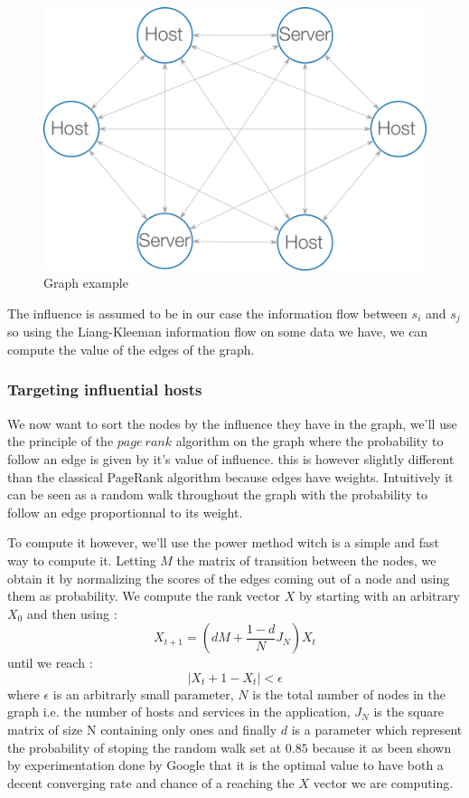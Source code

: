 \documentclass[10pt,a4paper,oneside]{article}
\begin{document}
\begin{figure}[!h]
\centering
\includegraphics[scale=0.6]{./images/PNG/Graphe.png}
\caption{Graph example}
\label{graph}
\end{figure}



\begin{multicols}{2}
The influence is assumed to be in our case the information flow between $s_i$ and $s_j$ so using the Liang-Kleeman information flow \cite{ref3} on some data we have, we can compute the value of the edges of the graph.
\subsubsection{Targeting influential hosts}
We now want to sort the nodes by the influence they have in the graph, we'll use the principle of the $page~rank$ algorithm \cite{ref4} on the graph where the probability to follow an edge is given by it's value of influence. this is however slightly different than the classical PageRank algorithm because edges have weights. Intuitively it can be seen as a random walk throughout the graph with the probability to follow an edge proportionnal to its weight.

To compute it however, we'll  use the power method witch is a simple and fast way to compute it. Letting $M$ the matrix of transition between the nodes, we obtain it by normalizing the scores of the edges coming out of a node and using them as probability. We compute the rank vector $X$ by starting with an arbitrary $X_0$ and then using :
	\[X_{t+1} = (dM + \frac{1-d}{N}J_N)X_t\]
until we reach :
	\[ \mid{X_t+1 - X_t}\mid < \epsilon\]
where $\epsilon$ is an arbitrarly small parameter, $N$ is the total number of nodes in the graph i.e. the number of hosts and services in the application, $J_N$ is the square matrix of size N containing only ones and finally $d$ is a parameter which represent the probability of stoping the random walk set at $0.85$ because it as been shown by experimentation done by Google that it is the optimal value to have both a decent converging rate and chance of a reaching the $X$ vector we are computing.
\end{multicols}
\end{document}

